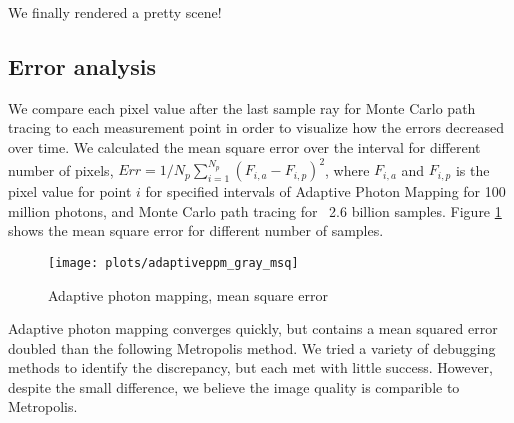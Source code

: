 We finally rendered a pretty scene!

\subsection*{Error analysis}
We compare each pixel value after the last sample ray for Monte Carlo path tracing to each measurement point in order to visualize how the errors decreased over time. We calculated the mean square error over the interval for different number of pixels, $Err = 1/N_p \sum_{i=1}^{N_p} (F_{i,a} - F_{i,p})^2$, where $F_{i,a}$ and $F_{i,p}$ is the pixel value for point $i$ for specified intervals of Adaptive Photon Mapping for 100 million photons, and Monte Carlo path tracing for ~2.6 billion samples. Figure \ref{fig:adaptive_msq} shows the mean square error for different number of samples.

\begin{figure}[H]
    \centering
    \texttt{[image: plots/adaptiveppm\_gray\_msq]}\\
    \caption{Adaptive photon mapping, mean square error}
    \label{fig:adaptive_msq}
\end{figure}

Adaptive photon mapping converges quickly, but contains a mean squared error doubled than the following Metropolis method. We tried a variety of debugging methods to identify the discrepancy, but each met with little success. However, despite the small difference, we believe the image quality is comparible to Metropolis. 




